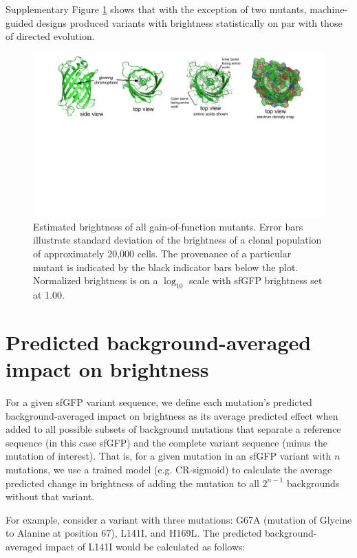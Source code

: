 Supplementary Figure \ref{gofbright} shows that with the exception of two mutants, machine-guided designs produced variants with brightness statistically on par with those of directed evolution.

\begin{figure}[h]
  \includegraphics[width=1\linewidth,page=9,trim={1cm 7cm 0cm 0}]{figures/2018-05-09-NIPS_2018_Figures.pdf}
  \caption[Estimated brightness of all gain-of-function mutants]{Estimated brightness of all gain-of-function mutants. Error bars illustrate standard deviation of the brightness of a clonal population of approximately 20,000 cells. The provenance of a particular mutant is indicated by the black indicator bars below the plot. Normalized brightness is on a $\log_{10}$ scale with sfGFP brightness set at 1.00.}
  \label{gofbright}
\end{figure}


\section{Predicted background-averaged impact on brightness} \label{sec:bgavg}

For a given sfGFP variant sequence, we define each mutation's predicted background-averaged impact on brightness as its average predicted effect when added to all possible subsets of background mutations that separate a reference sequence (in this case sfGFP) and the complete variant sequence (minus the mutation of interest). That is, for a given mutation in an sfGFP variant with $n$ mutations, we use a trained model (e.g. CR-sigmoid) to calculate the average predicted change in brightness of adding the mutation to all $2^{n-1}$ backgrounds without that variant.

For example, consider a variant with three mutations: G67A (mutation of Glycine to Alanine at position 67), L141I, and H169L. The predicted background-averaged impact of L141I would be calculated as follows:


